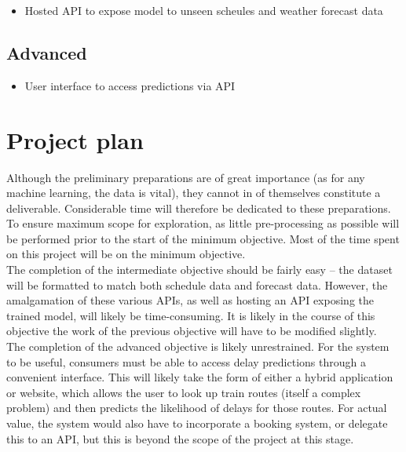 \documentclass[11pt]{article} %
\begin{document}
\begin{itemize}

	\item{Hosted API to expose model to unseen scheules and weather forecast data}

\end{itemize}

\subsection*{Advanced}

\begin{itemize}

	\item{User interface to access predictions via API}

\end{itemize}

\section*{Project plan}

Although the preliminary preparations are of great importance (as for any machine learning, the data is vital), they cannot in of themselves constitute a deliverable. Considerable time will therefore be dedicated to these preparations. To ensure maximum scope for exploration, as little pre-processing as possible will be performed prior to the start of the minimum objective. 
Most of the time spent on this project will be on the minimum objective. \\

The completion of the intermediate objective should be fairly easy – the dataset will be formatted to match both schedule data and forecast data. However, the amalgamation of these various APIs, as well as hosting an API exposing the trained model, will likely be time-consuming. It is likely in the course of this objective the work of the previous objective will have to be modified slightly. \\

The completion of the advanced objective is likely unrestrained. For the system to be useful, consumers must be able to access delay predictions through a convenient interface. This will likely take the form of either a hybrid application or website, which allows the user to look up train routes (itself a complex problem) and then predicts the likelihood of delays for those routes. For actual value, the system would also have to incorporate a booking system, or delegate this to an API, but this is beyond the scope of the project at this stage. 
\end{document}
